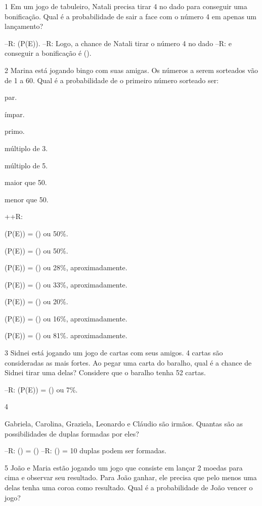 {\num{1} Em um jogo de tabuleiro, Natali precisa tirar 4 no dado para
conseguir uma bonificação. Qual é a probabilidade de sair a face com o
número 4 em apenas um lançamento?

--R: (P(E)).
--R: Logo, a chance de Natali tirar o número 4 no dado
--R: e conseguir a bonificação é ().

\num{2} Marina está jogando bingo com suas amigas. Os números a serem
sorteados vão de 1 a 60. Qual é a probabilidade de o primeiro número 
sorteado ser:
\item par.
\item ímpar.
\item primo.
\item múltiplo de 3.
\item múltiplo de 5.
\item maior que 50.
\item menor que 50.

++R:
\item (P(E)) = () ou 50\%.
\item (P(E)) = () ou 50\%.
\item (P(E)) = () ou 28\%, aproximadamente.
\item (P(E)) = () ou 33\%, aproximadamente.
\item (P(E)) = () ou 20\%.
\item (P(E)) = () ou 16\%, aproximadamente.
\item (P(E)) = () ou 81\%.
aproximadamente.

\num{3} Sidnei está jogando um jogo de cartas com seus amigos. 4 cartas são
consideradas as mais fortes. Ao pegar uma carta do baralho, qual é a
chance de Sidnei tirar uma delas? Considere que o baralho tenha 52
cartas.

--R: (P(E)) = () ou 7\%.

\num{4}

Gabriela, Carolina, Graziela, Leonardo e Cláudio são irmãos. Quantas são
as possibilidades de duplas formadas por eles?

--R: () = ()
--R: () = 10 duplas podem ser formadas.

\num{5} João e Maria estão jogando um jogo que consiste em lançar 2 moedas
para cima e observar seu resultado. Para João ganhar, ele precisa que
pelo menos uma delas tenha uma coroa como resultado. Qual é a
probabilidade de João vencer o jogo?

}
